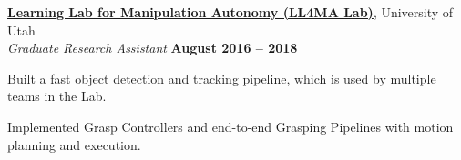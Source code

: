 \documentclass[margin, line]{resume}
\begin{document}
\begin{resume}
    \href{https://robot-learning.cs.utah.edu}{\textbf{Learning Lab for Manipulation Autonomy (LL4MA Lab)}}, University of Utah \vspace{1pt}\\\vspace{1pt}%
    \textsl{Graduate Research Assistant} \hfill \textbf{August 2016 -- 2018}\\ \vspace{-4.5mm}
    \begin{list2}
        \item Built a fast object detection and tracking pipeline, which is used by multiple teams in the Lab.
        \item Implemented Grasp Controllers and end-to-end Grasping Pipelines with motion planning and execution.
    \end{list2}\vspace{-0.1mm}




    \sectionline

\end{resume}
\end{document}
